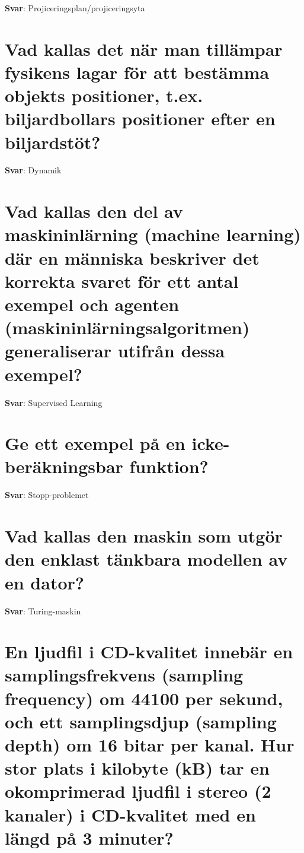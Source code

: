\documentclass[a4paper,11pt,oneside]{book}
\begin{document}
\begin{sloppypar}
\label{q:60:sa:sv:True}

\textbf{Svar}: Projiceringsplan/projiceringsyta



\section{Vad kallas det n\"ar man till\"ampar fysikens lagar f\"or att best\"amma objekts positioner, t.ex. biljardbollars positioner efter en biljardst\"ot?}

\label{q:61:sa:sv:True}

\textbf{Svar}: Dynamik



\section{Vad kallas den del av maskininl\"arning (machine learning) d\"ar en m\"anniska beskriver det korrekta svaret f\"or ett antal exempel och agenten (maskininl\"arningsalgoritmen) generaliserar utifr\r{a}n dessa exempel?}

\label{q:62:sa:sv:True}

\textbf{Svar}: Supervised Learning



\section{Ge ett exempel p\r{a} en icke-ber\"akningsbar funktion?}

\label{q:63:sa:sv:True}

\textbf{Svar}: Stopp-problemet



\section{Vad kallas den maskin som utg\"or den enklast t\"ankbara modellen av en dator?}

\label{q:64:sa:sv:True}

\textbf{Svar}: Turing-maskin



\section{En ljudfil i CD-kvalitet inneb\"ar en samplingsfrekvens (sampling frequency) om 44100 per sekund, och ett samplingsdjup (sampling depth) om 16 bitar per kanal. Hur stor plats i kilobyte (kB) tar en okomprimerad ljudfil i stereo (2 kanaler) i CD-kvalitet med en l\"angd p\r{a} 3 minuter?}


\end{sloppypar}
\end{document}
